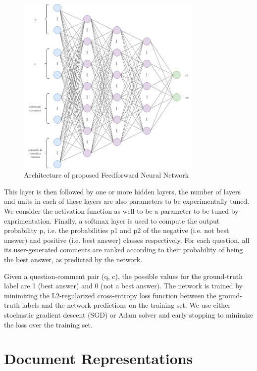 \documentclass[12pt, a4paper, oneside]{Thesis} %
\begin{document}
\begin{figure}[t!]
  \centering
  \includegraphics[keepaspectratio, width=0.8\textwidth]{./Pictures/ann-arch.png}
  \caption{Architecture of proposed Feedforward Neural Network}
  \label{fig:ann-arch}
\end{figure}

This layer is then followed by one or more hidden layers, the number of layers and units in each of these layers are also parameters to be experimentally tuned. We consider the activation function as well to be a parameter to be tuned by exprimentation. Finally, a softmax layer is used to compute the output probability p, i.e. the probabilities p1 and p2 of the negative (i.e. not best answer) and positive (i.e. best answer) classes respectively. For each question, all its user-generated comments are ranked according to their probability of being the best answer, as predicted by the network.

Given a question-comment pair (q, c), the possible values for the ground-truth label are 1 (best answer) and 0 (not a best answer). The network is trained by minimizing the L2-regularized cross-entropy loss function between the ground-truth labels and the network predictions on the training set. We use either stochastic gradient descent (SGD) or Adam solver and early stopping to minimize the loss over the training set.

\section{Document Representations}
\end{document}
